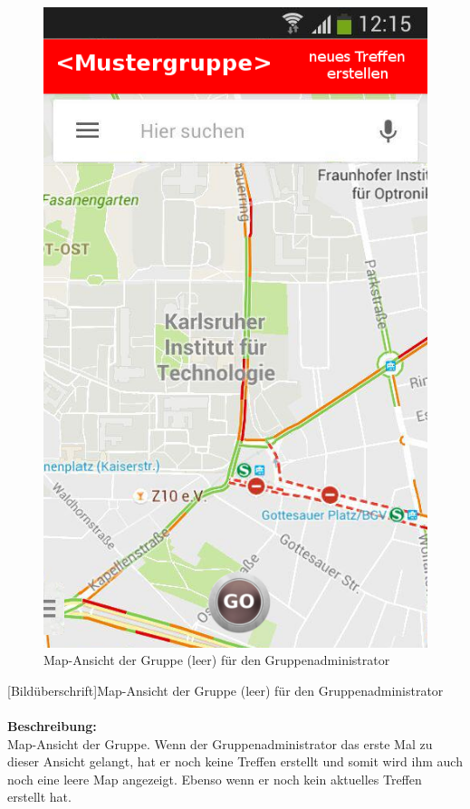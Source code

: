 \begin{figure}[H]
	\caption{Map-Ansicht der Gruppe (leer) für den Gruppenadministrator}
	\includegraphics[scale =0.5]{resources/images/map_leer_Admin.png}
\end{figure}
[Bildüberschrift]Map-Ansicht der Gruppe (leer) für den Gruppenadministrator\\ \\
\textbf{Beschreibung:}\\
Map-Ansicht der Gruppe. Wenn der Gruppenadministrator das erste Mal zu dieser Ansicht gelangt, hat er noch keine Treffen erstellt und somit wird ihm auch noch eine leere Map angezeigt. Ebenso wenn er noch kein aktuelles Treffen erstellt hat.\\
